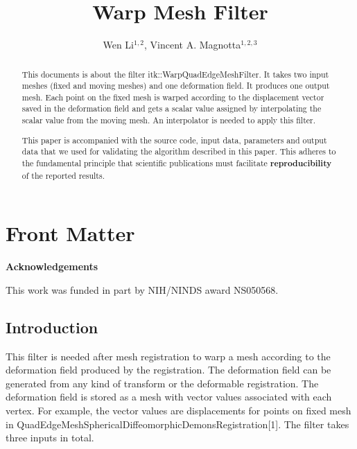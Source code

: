 \documentclass{InsightArticle}
\title{Warp Mesh Filter}
\author{Wen Li$^{1,2}$, Vincent A. Magnotta$^{1,2,3}$}
\makeatletter
\newcommand\ackname{Acknowledgements}
\newenvironment{acknowledgements}{%
      \titlepage
      \null\vfil
      \@beginparpenalty\@lowpenalty
      \begin{center}%
        \bfseries \ackname
        \@endparpenalty\@M
      \end{center}}%
     {\par\vfil\null\endtitlepage}
\newenvironment{acknowledgements}{%
      \if@twocolumn
        \section*{\abstractname}%
      \else
        \small
        \begin{center}%
          {\bfseries \ackname\vspace{-.5em}\vspace{\z@}}%
        \end{center}%
        \quotation
      \fi}
      {\if@twocolumn\else\endquotation\fi}
\newcommand{\IJhandlerIDnumber}{3117}
\makeatother
\begin{document}
%
% 
\IJhandlefooter{\IJhandlerIDnumber}


\ifpdf
\else
\fi


\maketitle


\ifhtml
\chapter*{Front Matter\label{front}}
\fi


\begin{abstract}
 
This documents is about the filter itk::WarpQuadEdgeMeshFilter.  It
takes two input meshes (fixed and moving meshes) and one deformation field. 
It produces one output mesh.
Each point on the fixed mesh is warped according to the displacement 
vector saved in the deformation field and gets a scalar value assigned 
by interpolating the scalar value from the moving mesh. An interpolator 
is needed 
to apply this filter.

This paper is accompanied with the source code, input data, parameters and
output data that we used for validating the algorithm described in this paper.
This adheres to the fundamental principle that scientific publications must
facilitate \textbf{reproducibility} of the reported results.
\end{abstract}

\begin{acknowledgements}
This work was funded in part by NIH/NINDS award NS050568.
\end{acknowledgements}

\tableofcontents

\section{Introduction}
This filter is needed after mesh registration to warp a mesh according to the
deformation field produced by the registration.  The deformation field can be generated 
from any kind of transform or the deformable registration. The deformation field
is stored as a mesh with vector values associated with each vertex. For example, 
the vector values are displacements for
 points on fixed mesh in QuadEdgeMeshSphericalDiffeomorphicDemonsRegistration[1]. 
The filter takes three inputs in total. 
\end{document}
